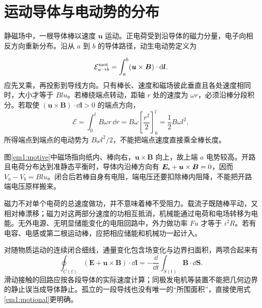 \section{运动导体与电动势的分布}

静磁场中，一根导体棒以速度 $\bm u$ 运动。正电荷受到沿导体的磁力分量，电子向相反方向重新分布。沿从 $a$ 到 $b$ 的导体路径，动生电动势定义为

\begin{equation}\mathcal E_{a\to b}^{\rm mot}=\int_a^b(\bm u\times\bm B)\cdot\mathop{}\!\mathrm d\bm l.\label{em1:motional}\end{equation}
应先叉乘，再投影到导线方向。只有棒长、速度和磁场彼此垂直且各处速度相同时，大小才等于 $Blu$。若棒绕端点转动，距轴 $r$ 处的速度为 $\omega r$，必须沿棒分段积分。若取使 $(\bm u\times\bm B)\cdot\dd\bm l>0$ 的端点方向，
\[
\mathcal E=\int_0^l B\omega r\,\dd r
=B\omega\left[\frac{r^2}{2}\right]_0^l
=\frac12B\omega l^2,
\]
所得端点到端点的电动势为 $B\omega l^2/2$，不能把端点速度直接乘全棒长度。


图\ref{em1:motive}中磁场指向纸内、棒向右，$\bm u\times\bm B$ 向上，故上端 $a$ 电势较高。开路且电荷分布达到准静态平衡时，导体内沿棒方向有 $\bm E_{\rm s}+\bm u\times\bm B=0$，因而 $V_a-V_b=Blu$。闭合后若棒自身有电阻，端电压还要扣除棒内阻降，不能把开路端电压原样搬来。


磁力不对单个电荷的总速度做功，并不意味着棒不受阻力。载流子既随棒平动，又相对棒漂移；磁力对这两部分速度的功相互抵消，机械能通过电荷和电场转移为电能。无外电源、无明显储能变化的电阻回路中，外力做功率 $F u$ 才等于 $i^2R$。若有电容、电感或第二根运动棒，应把相应储能和机械功一起计入。


对随物质运动的连续闭合细线，通量变化包含场变化与边界扫面积，两项合起来有
\begin{equation}\oint_{C(t)}(\bm E+\bm u\times\bm B)\cdot\dd\bm l
=-\frac{\dd}{\dd t}\int_{S(t)}\bm B\cdot\dd\bm S.\label{em1:moving}\end{equation}
滑动接触的回路应按各段导体的实际速度计算；同极发电机等装置不能把几何边界的静止误当成导体静止。孤立的一段导线也没有唯一的“所围面积”，直接使用式\eqref{em1:motional}更明确。



